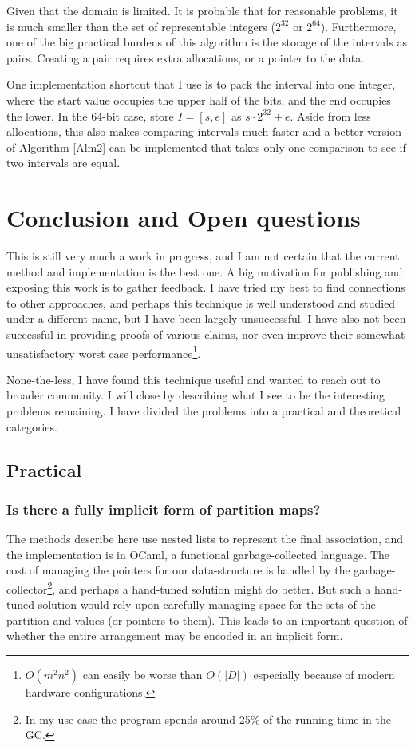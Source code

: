 \documentclass{article}
\begin{document}
Given that the domain is limited.
It is probable that for reasonable problems,
it is much smaller than the set of representable integers ($2^{32}$ or $2^64$).
Furthermore,
one of the big practical burdens of this algorithm is the storage of the intervals
as pairs.
Creating a pair requires extra allocations, or a pointer to the data.

One implementation shortcut that I use is to pack the interval into one integer,
where the start value occupies the upper half of the bits,
and the end occupies the lower.
In the 64-bit case, store $I = [s,e]$ as  $s \cdot 2^{32}+e$.
Aside from less allocations,
this also makes comparing intervals much faster
and a better version of Algorithm \ref{Alm2} can be implemented that
takes only one comparison to see if two intervals are equal.

\section{Conclusion and Open questions}

This is still very much a work in progress,
and I am not certain that the current method and implementation is the best one.
A big motivation for publishing and exposing this work is to gather feedback.
I have tried my best to find connections to other approaches,
and perhaps this technique is well understood and studied under a different name,
but I have been largely unsuccessful.
I have also not been successful in providing proofs of various claims,
nor even improve their somewhat unsatisfactory worst case
performance\footnote{$O(m^{2}n^{2})$ can easily be worse than $O(|D|)$ especially because
of modern hardware configurations.}.

None-the-less, I have found this technique useful and wanted to reach out to
broader community.
I will close by describing what I see to be the interesting problems remaining.
I have divided the problems into a practical and theoretical categories.

\subsection{Practical}
\subsubsection{Is there a fully implicit form of partition maps?}

The methods describe here use nested lists to represent the final association,
and the implementation is in OCaml\cite{ocaml-manual},
a functional garbage-collected language.
The cost of managing the pointers for our data-structure is handled by the
garbage-collector\footnote{
  In my use case the program spends around 25\% of the running time in the GC.},
and perhaps a hand-tuned solution might do better.
But such a hand-tuned solution would rely upon carefully managing space for
the sets of the partition and values (or pointers to them).
This leads to an important question of whether the entire arrangement may be
encoded in an implicit form.
\end{document}
